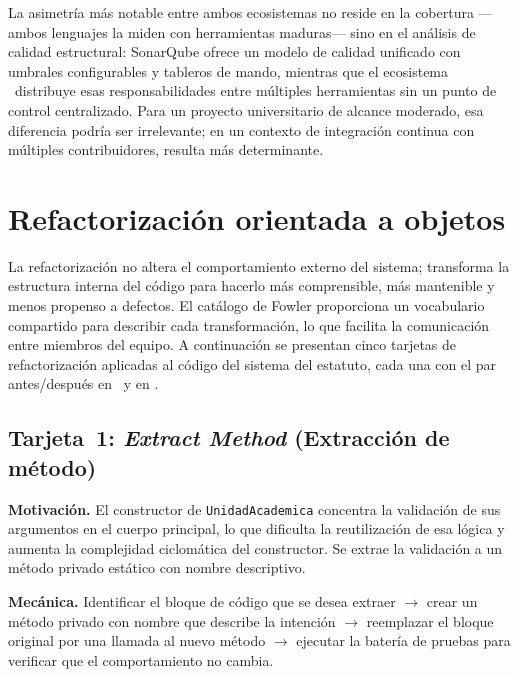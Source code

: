 \noindent
La asimetría más notable entre ambos ecosistemas no reside en la cobertura ---ambos lenguajes
la miden con herramientas maduras--- sino en el análisis de calidad estructural: SonarQube
ofrece un modelo de calidad unificado con umbrales configurables y tableros de mando, mientras
que el ecosistema \rust\ distribuye esas responsabilidades entre múltiples herramientas sin un
punto de control centralizado. Para un proyecto universitario de alcance moderado, esa
diferencia podría ser irrelevante; en un contexto de integración continua con múltiples
contribuidores, resulta más determinante.


\section{Refactorización orientada a objetos}
\label{sec:refactorizacion}

La refactorización no altera el comportamiento externo del sistema; transforma la estructura
interna del código para hacerlo más comprensible, más mantenible y menos propenso a defectos.
El catálogo de Fowler \parencite{Fowler2018} proporciona un vocabulario compartido para
describir cada transformación, lo que facilita la comunicación entre miembros del equipo.
A continuación se presentan cinco tarjetas de refactorización aplicadas al código del
sistema del estatuto, cada una con el par antes/después en \java\ y en \rust.

\subsection{Tarjeta~1: \textit{Extract Method} (Extracción de método)}
\label{subsec:refact-extract-method}

\textbf{Motivación.} El constructor de \texttt{UnidadAcademica} concentra la validación de
sus argumentos en el cuerpo principal, lo que dificulta la reutilización de esa lógica y
aumenta la complejidad ciclomática del constructor. Se extrae la validación a un método
privado estático con nombre descriptivo.

\textbf{Mecánica.} Identificar el bloque de código que se desea extraer $\rightarrow$
crear un método privado con nombre que describe la intención $\rightarrow$ reemplazar
el bloque original por una llamada al nuevo método $\rightarrow$ ejecutar la batería de
pruebas para verificar que el comportamiento no cambia.

